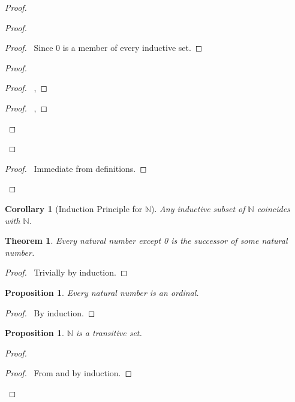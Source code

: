\documentclass{book}
\let\qed\relax
\newtheorem{prop}[ax]{Proposition}
\newtheorem{cor}{Corollary}[ax]
\newtheorem{thm}[ax]{Theorem}
\theoremstyle{definition}
\begin{document}
\begin{proof}
\pf
{}
\begin{proof}
	\begin{proof}
		\pf\ Since $0$ is a member of every inductive set.
	\end{proof}
	\begin{proof}
		\begin{proof}
			\pf\ , 
		\end{proof}
		\begin{proof}
			\pf\ , 
		\end{proof}
	\end{proof}
\end{proof}
\begin{proof}
	\pf\ Immediate from definitions.
\end{proof}
\qed
\end{proof}

\begin{cor}[Induction Principle for $\mathbb{N}$]
Any inductive subset of $\mathbb{N}$ coincides with $\mathbb{N}$.
\end{cor}

\begin{thm}
\label{thm:zeroorsucc}
Every natural number except 0 is the successor of some natural number.
\end{thm}

\begin{proof}
\pf\ Trivially by induction. \qed
\end{proof}

\begin{prop}
\label{prop:nattrans}
Every natural number is an ordinal.
\end{prop}

\begin{proof}
\pf\ By induction. \qed
\end{proof}

\begin{prop}
$\mathbb{N}$ is a transitive set.
\end{prop}

\begin{proof}
\pf
{}
\begin{proof}
	\pf\ From  and  by induction.
\end{proof}
\qed
\end{proof}
\end{document}
